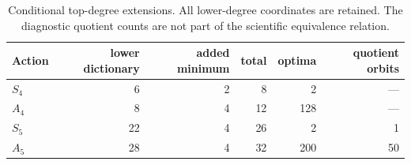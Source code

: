 \begin{table}[htbp]
\centering
\small
\caption{Conditional top-degree extensions.  All lower-degree coordinates are
retained.  The diagnostic quotient counts are not part of the scientific
equivalence relation.}
\label{tab:conditional}
\begin{tabular}{lrrrrr}
\toprule
Action & lower dictionary & added minimum & total & optima & quotient orbits\\
\midrule
$S_4$ & 6 & 2 & 8 & 2 & ---\\
$A_4$ & 8 & 4 & 12 & 128 & ---\\
$S_5$ & 22 & 4 & 26 & 2 & 1\\
$A_5$ & 28 & 4 & 32 & 200 & 50\\
\bottomrule
\end{tabular}
\end{table}
